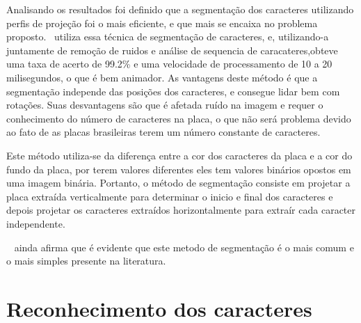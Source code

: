 Analisando os resultados foi definido que a segmentação dos caracteres utilizando perfis de projeção foi o mais eficiente, e que mais se encaixa no problema proposto.~\cite{sanyuan2004car} utiliza essa técnica de segmentação de caracteres, e, utilizando-a juntamente de remoção de ruidos e análise de sequencia de caracateres,obteve uma taxa de acerto de 99.2\% e uma velocidade de processamento de 10 a 20 milisegundos, o que é bem animador. As vantagens deste método é que a segmentação independe das posições dos caracteres, e consegue lidar bem com rotações. Suas desvantagens são que é afetada ruído na imagem e requer o conhecimento do número de caracteres na placa, o que não será problema devido ao fato de as placas brasileiras terem um número constante de caracteres.

Este método utiliza-se da diferença entre a cor dos caracteres da placa e a cor do fundo da placa, por terem valores diferentes eles tem valores binários opostos em uma imagem binária. Portanto, o método de segmentação consiste em projetar a placa extraída verticalmente para determinar o inicio e final dos caracteres e depois projetar os caracteres extraídos horizontalmente para extraír cada caracter independente.

~\cite{s2013automatic} ainda afirma que é evidente que este metodo de segmentação é o mais comum e o mais simples presente na literatura.

\section{Reconhecimento dos caracteres}
\label{sec:reconhecimento}
